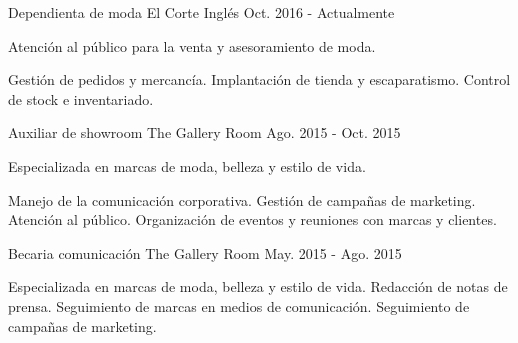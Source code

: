 

\begin{cventries}

  \cventry
    {Dependienta de moda} %
    {El Corte Inglés} %
    {} %
    {Oct. 2016 - Actualmente} %
    {
      \begin{cvitems} %
        \item {Atención al público para la venta y asesoramiento de moda.}
        \item {Gestión de pedidos y mercancía. Implantación de tienda y escaparatismo. Control de stock e inventariado.}
      \end{cvitems}
    }

  \cventry
    {Auxiliar de showroom} %
    {The Gallery Room} %
    {} %
    {Ago. 2015 - Oct. 2015} %
    {
      \begin{cvitems} %
        \item {Especializada en marcas de moda, belleza y estilo de vida.}
        \item {Manejo de la comunicación corporativa. Gestión de campañas de marketing. Atención al público. Organización de eventos y reuniones con marcas y clientes.}
      \end{cvitems}
    }

  \cventry
    {Becaria comunicación} %
    {The Gallery Room} %
    {} %
    {May. 2015 - Ago. 2015} %
    {
      \begin{cvitems} %
        \item {Especializada en marcas de moda, belleza y estilo de vida. Redacción de notas de prensa. Seguimiento de marcas en medios de comunicación. Seguimiento de campañas de marketing.}
      \end{cvitems}
    }


\end{cventries}
